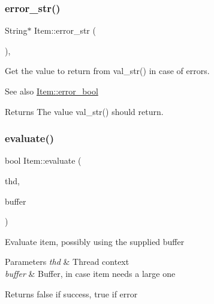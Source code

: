 \subsubsection{\texorpdfstring{error\+\_\+str()}{error\_str()}}
{\footnotesize\ttfamily String$\ast$ Item\+::error\+\_\+str (\begin{DoxyParamCaption}{ }\end{DoxyParamCaption})\hspace{0.3cm}{\ttfamily [inline]}, {\ttfamily [protected]}}

Get the value to return from val\+\_\+str() in case of errors.

\begin{DoxySeeAlso}{See also}
\mbox{\hyperlink{classItem_a45c8c303465b71321c15ae43583de83f}{Item\+::error\+\_\+bool}}
\end{DoxySeeAlso}
\begin{DoxyReturn}{Returns}
The value val\+\_\+str() should return. 
\end{DoxyReturn}
\mbox{\label{classItem_ab0f6b295c74578740e30998424daa717}} 
\subsubsection{\texorpdfstring{evaluate()}{evaluate()}}
{\footnotesize\ttfamily bool Item\+::evaluate (\begin{DoxyParamCaption}\item[{T\+HD $\ast$}]{thd,  }\item[{String $\ast$}]{buffer }\end{DoxyParamCaption})}

Evaluate item, possibly using the supplied buffer


\begin{DoxyParams}{Parameters}
{\em thd} & Thread context \\
\hline
{\em buffer} & Buffer, in case item needs a large one\\
\hline
\end{DoxyParams}
\begin{DoxyReturn}{Returns}
false if success, true if error 
\end{DoxyReturn}
\mbox{\label{classItem_a8aefc8bd78c2530c57e0fda53063c99d}} 
